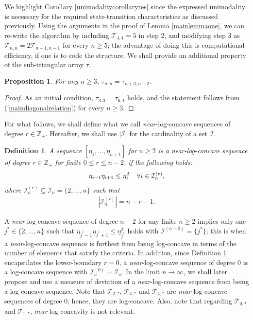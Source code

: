 \documentclass[a4paper,12pt]{article}
\newtheorem{defn}[thm]{Definition}
\newtheorem{prop}[thm]{Proposition}
\def\Z{\mathbb{Z}}
\def\T{\mathcal{T}}
\begin{document}
We highlight Corollary \ref{unimodalitycorollaryres} since the expressed unimodality is necessary for the required state-transition characteristics as discussed previously. Using the arguments in the proof of Lemma \ref{mainlemmaone}, we can re-write the algorithm by including $\T_{4,4} = 5$ in step 2, and modifying step 3 as $\T_{n,n} = 2\T_{n-1,n-1}$ for every $n \geq 5$; the advantage of doing this is computational efficiency, if one is to code the structure. 
We shall provide an additional property of the sub-triangular array $\tau$.
\begin{prop}
For any $n\geq 3$, $\tau_{n,n} = \tau_{n+3,n - 2}$.
\end{prop}
\begin{proof}
As an initial condition, $\tau_{3,3} = \tau_{6,1}$ holds, and the statement follows from (\ref{maindiagonalrelation}) for every $n\geq 3$.
\end{proof}
For what follows, we shall define what we call \emph{near}-log-concave sequences of degree $r\in \Z_+$. Hereafter, we shall use $|\mathcal{I}|$ for the cardinality of a set $\mathcal{I}$.
\begin{defn}
\label{nearlogconcave}
A sequence $[\eta_1,\ldots,\eta_{n+1}]$ for $n\geq 2$ is a \emph{near}-log-concave sequence of degree $r\in \Z_+$ for finite $0 \leq r \leq n-2$, if the following holds:
\begin{align}
\eta_{i-1}\eta_{i+1} \leq \eta^2_{i} \hspace{0.15in} \text{$\forall i\in\mathcal{I}_{n}^{(r)}$}, \notag
\end{align}
where $\mathcal{I}_{n}^{(r)} \subseteq \mathcal{I}_{n} = \{2,\ldots,n\}$ such that 
\begin{align}
|\mathcal{I}_{n}^{(r)}| = n - r - 1.
\end{align}
\end{defn}
A \emph{near}-log-concave sequence of degree $n-2$ for any finite $n\geq 2$ implies only one $j^*\in\{2,\ldots,n\}$ such that $\eta_{j^*-1}\eta_{j^*+1} \leq \eta^2_{j^*}$ holds with $\mathcal{I}^{(n-2)} = \{j^*\}$; this is when a \emph{near}-log-concave sequence is furthest from being log-concave in terms of the number of elements that satisfy the criteria. In addition, since Definition \ref{nearlogconcave} encapsulates the lower-boundary $r=0$, a \emph{near}-log-concave sequence of degree 0 is a log-concave sequence with $\mathcal{I}_{n}^{(0)} = \mathcal{I}_{n}$. In the limit $n\rightarrow\infty$, we shall later propose and use a measure of deviation of a \emph{near}-log-concave sequence from being a log-concave sequence. Note that $\T_{2,*}$, $\T_{3,*}$ and $\T_{4,*}$ are \emph{near}-log-concave sequences of degree 0; hence, they are log-concave. Also, note that regarding $\T_{0,*}$ and $\T_{1,*}$, \emph{near}-log-concavity is not relevant.
\end{document}
